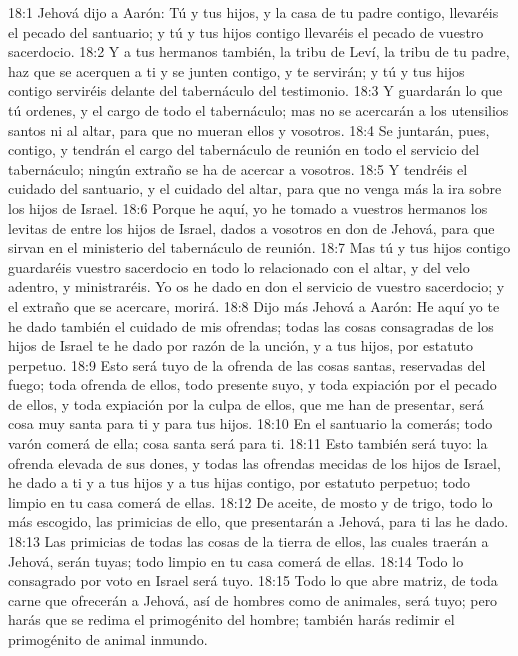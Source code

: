 18:1 Jehová dijo a Aarón: Tú y tus hijos, y la casa de tu padre contigo, llevaréis el pecado del santuario; y tú y tus hijos contigo llevaréis el pecado de vuestro sacerdocio.  
18:2 Y a tus hermanos también, la tribu de Leví, la tribu de tu padre, haz que se acerquen a ti y se junten contigo, y te servirán; y tú y tus hijos contigo serviréis delante del tabernáculo del testimonio.  
18:3 Y guardarán lo que tú ordenes, y el cargo de todo el tabernáculo; mas no se acercarán a los utensilios santos ni al altar, para que no mueran ellos y vosotros.  
18:4 Se juntarán, pues, contigo, y tendrán el cargo del tabernáculo de reunión en todo el servicio del tabernáculo; ningún extraño se ha de acercar a vosotros.  
18:5 Y tendréis el cuidado del santuario, y el cuidado del altar, para que no venga más la ira sobre los hijos de Israel.  
18:6 Porque he aquí, yo he tomado a vuestros hermanos los levitas de entre los hijos de Israel, dados a vosotros en don de Jehová, para que sirvan en el ministerio del tabernáculo de reunión.  
18:7 Mas tú y tus hijos contigo guardaréis vuestro sacerdocio en todo lo relacionado con el altar, y del velo adentro, y ministraréis. Yo os he dado en don el servicio de vuestro sacerdocio; y el extraño que se acercare, morirá.  
18:8 Dijo más Jehová a Aarón: He aquí yo te he dado también el cuidado de mis ofrendas; todas las cosas consagradas de los hijos de Israel te he dado por razón de la unción, y a tus hijos, por estatuto perpetuo.  
18:9 Esto será tuyo de la ofrenda de las cosas santas, reservadas del fuego; toda ofrenda de ellos, todo presente suyo, y toda expiación por el pecado de ellos, y toda expiación por la culpa de ellos, que me han de presentar, será cosa muy santa para ti y para tus hijos.  
18:10 En el santuario la comerás; todo varón comerá de ella; cosa santa será para ti.  
18:11 Esto también será tuyo: la ofrenda elevada de sus dones, y todas las ofrendas mecidas de los hijos de Israel, he dado a ti y a tus hijos y a tus hijas contigo, por estatuto perpetuo; todo limpio en tu casa comerá de ellas.  
18:12 De aceite, de mosto y de trigo, todo lo más escogido, las primicias de ello, que presentarán a Jehová, para ti las he dado.  
18:13 Las primicias de todas las cosas de la tierra de ellos, las cuales traerán a Jehová, serán tuyas; todo limpio en tu casa comerá de ellas.  
18:14 Todo lo consagrado por voto en Israel será tuyo.  
18:15 Todo lo que abre matriz, de toda carne que ofrecerán a Jehová, así de hombres como de animales, será tuyo; pero harás que se redima el primogénito del hombre; también harás redimir el primogénito de animal inmundo.  
